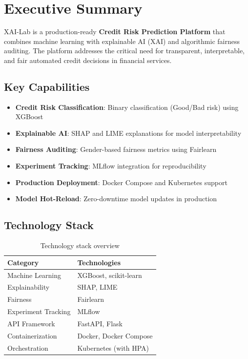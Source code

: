 \documentclass[11pt,a4paper]{article}
\begin{document}
\tableofcontents
\newpage

\section{Executive Summary}

XAI-Lab is a production-ready \textbf{Credit Risk Prediction Platform} that combines machine learning with explainable AI (XAI) and algorithmic fairness auditing. The platform addresses the critical need for transparent, interpretable, and fair automated credit decisions in financial services.

\subsection{Key Capabilities}

\begin{itemize}[leftmargin=*]
    \item \textbf{Credit Risk Classification}: Binary classification (Good/Bad risk) using XGBoost
    \item \textbf{Explainable AI}: SHAP and LIME explanations for model interpretability
    \item \textbf{Fairness Auditing}: Gender-based fairness metrics using Fairlearn
    \item \textbf{Experiment Tracking}: MLflow integration for reproducibility
    \item \textbf{Production Deployment}: Docker Compose and Kubernetes support
    \item \textbf{Model Hot-Reload}: Zero-downtime model updates in production
\end{itemize}

\subsection{Technology Stack}

\begin{table}[H]
\centering
\begin{tabular}{@{}ll@{}}
\toprule
\textbf{Category} & \textbf{Technologies} \\
\midrule
Machine Learning & XGBoost, scikit-learn \\
Explainability & SHAP, LIME \\
Fairness & Fairlearn \\
Experiment Tracking & MLflow \\
API Framework & FastAPI, Flask \\
Containerization & Docker, Docker Compose \\
Orchestration & Kubernetes (with HPA) \\
\bottomrule
\end{tabular}
\caption{Technology stack overview}
\end{table}
\end{document}
